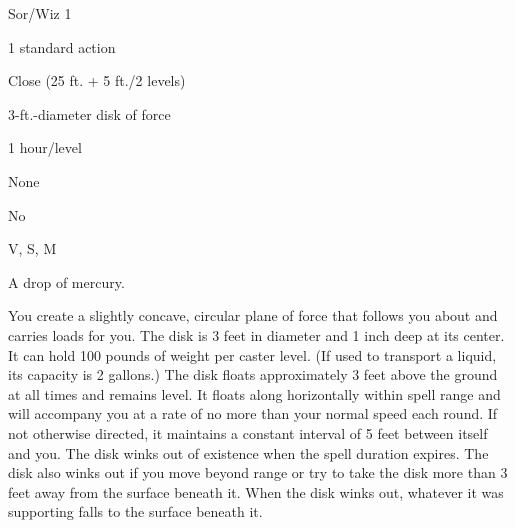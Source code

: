
\begin{description*}
\item[Level:] Sor/Wiz 1
\item[Casting Time:] 1 standard action
\item[Range:] Close (25 ft. + 5 ft./2 levels)
\item[Effect:] 3-ft.-diameter disk of force
\item[Duration:] 1 hour/level
\item[Saving Throw:] None
\item[Spell Resistance:] No
\item[Components:] V, S, M
\item[Arcane Material Component:] A drop of mercury.
\end{description*}

You create a slightly concave, circular plane of force that follows you about and
carries loads for you. The disk is 3 feet in diameter and 1 inch deep at its center.
It can hold 100 pounds of weight per caster level. (If used to transport a liquid,
its capacity is 2 gallons.) The disk floats approximately 3 feet above the ground
at all times and remains level. It floats along horizontally within spell range
and will accompany you at a rate of no more than your normal speed each round.
If not otherwise directed, it maintains a constant interval of 5 feet between itself
and you. The disk winks out of existence when the spell duration expires. The disk
also winks out if you move beyond range or try to take the disk more than 3 feet
away from the surface beneath it. When the disk winks out, whatever it was supporting
falls to the surface beneath it.